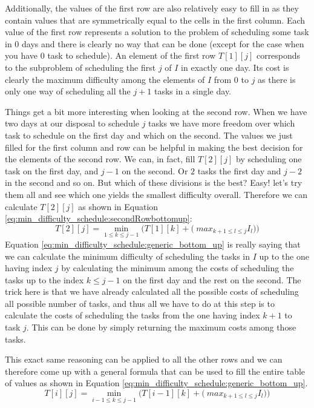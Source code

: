 Additionally, the values of the first row are also relatively easy to fill in as they contain values that are symmetrically equal to the cells in the first column. Each value
of the first row represents a solution to the problem of scheduling some task in $0$ days and there
is clearly no way that can be done (except for the case when you have $0$ task to schedule).  An element of the first row $T[1][j]$
corresponds to the subproblem of scheduling the first $j$ of $I$ in exactly one day. Its cost is
clearly the maximum difficulty among the elements of $I$ from $0$ to $j$ as there is only one way of
scheduling all the $j+1$ tasks in a single day.

Things get a bit more interesting when looking at the second row. When we have two days at our
disposal to schedule $j$ tasks we have more freedom over which task to schedule on the first day and
which on the second. The values we just filled for the first column and row can be helpful in making
the best decision for the elements of the second row. We can, in fact, fill $T[2][j]$ by scheduling
one task on the first day, and $j-1$ on the second. Or $2$ tasks the first day and $j-2$ in the
second and so on. But which of these divisions is the best? Easy! let's try them all and see which
one yields the smallest difficulty overall. Therefore we can calculate $T[2][j]$  as shown in
Equation \ref{eq:min_difficulty_schedule:secondRowbottomup}:
\begin{equation}
    T[2][j] = \min_{1 \leq k \leq j-1} \Big( T[1][k] + \big(\ max_{k+1 \leq l \leq j }I_l \big)  \Big)
\label{eq:min_difficulty_schedule:secondRowbottomup}
\end{equation}
Equation \ref{eq:min_difficulty_schedule:generic_bottom_up} is really saying that we can calculate
the minimum difficulty of scheduling the tasks in $I$ up to the one having index $j$ by calculating
the minimum among the costs of scheduling the tasks up to the index $k \leq j-1$ on the first day
and the rest on the second. The trick here is that we have already calculated all the possible costs
of scheduling all possible number of tasks, and thus all we have to do at this step is to calculate
the costs of scheduling the tasks from the one having index $k+1$ to task $j$. This can be done by
simply returning the maximum costs among those tasks.

This exact same reasoning can be applied to all the other rows and we can therefore come up with a
general formula that can be used to fill the entire table of values as shown in Equation
\ref{eq:min_difficulty_schedule:generic_bottom_up}.
\begin{equation}
    T[i][j] = \min_{i-1 \leq k \leq j-1} \Big( T[i-1][k] + \big(\ max_{k+1 \leq l \leq j }I_l \big)  \Big)
    \label{eq:min_difficulty_schedule:generic_bottom_up}
\end{equation}


